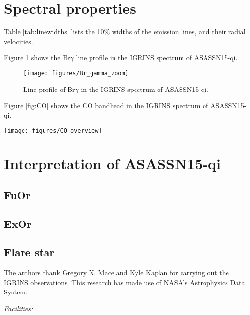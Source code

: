 \documentclass[iop,revtex4]{emulateapj}%
\newcommand{\name}{ASASSN15-qi}
\begin{document}
\section{Spectral properties}\label{sec:lines}

Table \ref{tab:linewidths} lists the 10\% widths of the emission lines, and their radial velocities.



Figure \ref{fig:BrG} shows the Br$\gamma$ line profile in the IGRINS spectrum of \name.

\begin{figure}
	\centering
	\texttt{[image: figures/Br\_gamma\_zoom]} 
	\caption{Line profile of Br$\gamma$ in the IGRINS spectrum of \name.}
	\label{fig:BrG}
\end{figure}

Figure \ref{fig:CO} shows the CO bandhead in the IGRINS spectrum of \name.

\begin{figure*}
	\centering
	\texttt{[image: figures/CO\_overview]} 
	\caption{CO bandhead in the IGRINS spectrum of \name.}
	\label{fig:CO}
\end{figure*}

\section{Interpretation of \name}\label{sec:interp} 
\subsection{FuOr}
\subsection{ExOr}
\subsection{Flare star}

\acknowledgements
The authors thank Gregory N. Mace and Kyle Kaplan for carrying out the IGRINS observations. This research has made use of NASA's Astrophysics Data System.

{\it Facilities:} 

\clearpage



\end{document}
